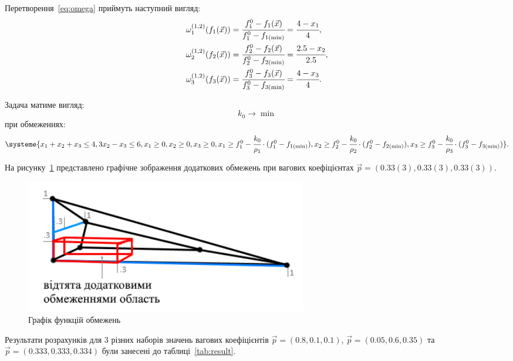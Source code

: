 Перетворення~\eqref{eq:omega} приймуть наступний вигляд:
\begin{align*}
\omega^{(1,2)}_1(f_1(\vec{x})) &= 
\cfrac{f_1^0-f_1(\vec{x})}{f_1^0 - f_{1(\min)}} =
\cfrac{4 - x_1}{4}, \\
\omega^{(1,2)}_2(f_2(\vec{x})) &= 
\cfrac{f_2^0-f_2(\vec{x})}{f_2^0 - f_{2(\min)}} =
\cfrac{2.5 - x_2}{2.5}, \\
\omega^{(1,2)}_3(f_3(\vec{x})) &= 
\cfrac{f_3^0-f_3(\vec{x})}{f_3^0 - f_{3(\min)}} =
\cfrac{4 - x_3}{4}.
\end{align*}

Задача матиме вигляд:
\[
k_0 \to \min
\]
при обмеженнях:
\[
\systeme{
x_1 + x_2 + x_3 \leq 4,
3x_2 - x_3 \leq 6,
x_1 \geq 0,
x_2 \geq 0,
x_3 \geq 0,
x_1 \geq f_1^0 - \cfrac{k_0}{\rho_1} \cdot (f_1^0 -f_{1(\min)}), 
x_2 \geq f_2^0 - \cfrac{k_0}{\rho_2} \cdot (f_2^0 -f_{2(\min)}), 
x_3 \geq f_3^0 - \cfrac{k_0}{\rho_3} \cdot (f_3^0 -f_{3(\min)})
}
.
\]

На рисунку~\ref{fig:bounds} представлено графічне зображення додаткових обмежень при вагових коефіцієнтах $\vec{p} = (0.33{\scriptstyle (3)}, 0.33{\scriptstyle (3)}, 0.33{\scriptstyle (3)})$. 
\begin{figure}[H]
  \centering
    \includegraphics[width=0.6\textwidth]{figures/bounds}
  \caption{Графік функцій обмежень}
  \label{fig:bounds}
\end{figure}

Результати розрахунків для 3 різних наборів значень вагових коефіцієнтів $\vec{p} = (0.8, 0.1, 0.1)$, $\vec{p} = (0.05, 0.6, 0.35)$ та $\vec{p} = (0.333, 0.333, 0.334)$ були занесені до таблиці~\ref{tab:result}.

